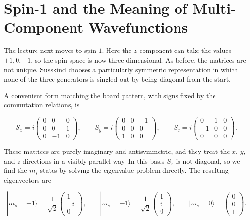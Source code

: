 \section{Spin-1 and the Meaning of Multi-Component Wavefunctions}

The lecture next moves to spin \(1\). Here the \(z\)-component can take the values \(+1,0,-1\), so the spin space is now three-dimensional. As before, the matrices are not unique. Susskind chooses a particularly symmetric representation in which none of the three generators is singled out by being diagonal from the start.

A convenient form matching the board pattern, with signs fixed by the commutation relations, is

\begin{equation}
S_x
=
i
\begin{pmatrix}
0&0&0\\
0&0&1\\
0&-1&0
\end{pmatrix},
\qquad
S_y
=
i
\begin{pmatrix}
0&0&-1\\
0&0&0\\
1&0&0
\end{pmatrix},
\qquad
S_z
=
i
\begin{pmatrix}
0&1&0\\
-1&0&0\\
0&0&0
\end{pmatrix}.
\end{equation}

These matrices are purely imaginary and antisymmetric, and they treat the \(x\), \(y\), and \(z\) directions in a visibly parallel way. In this basis \(S_z\) is not diagonal, so we find the \(m_s\) states by solving the eigenvalue problem directly. The resulting eigenvectors are

\begin{equation}
|m_s=+1\rangle=\frac{1}{\sqrt2}
\begin{pmatrix}
1\\
-i\\
0
\end{pmatrix},
\qquad
|m_s=-1\rangle=\frac{1}{\sqrt2}
\begin{pmatrix}
1\\
i\\
0
\end{pmatrix},
\qquad
|m_s=0\rangle=
\begin{pmatrix}
0\\
0\\
1
\end{pmatrix}.
\end{equation}

